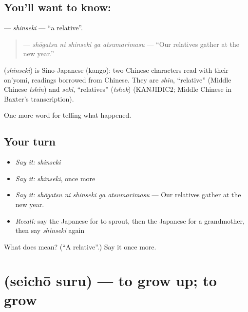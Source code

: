 \subsection*{You'll want to know: }
\textbf{} — \emph{shinseki} — \textquotedblleft{}a relative\textquotedblright{}.

\begin{quote}
\textbf{  } — \emph{shōgatsu ni shinseki ga atsumarimasu} — \textquotedblleft{}Our relatives gather at the new year.\textquotedblright{}
\end{quote}

\begin{cousinweb}
\textbf{} (\emph{shinseki}) is Sino-Japanese (kango): two Chinese characters read with their on'yomi, readings borrowed from Chinese. They are \emph{shin}, \textquotedblleft{}relative\textquotedblright{} (Middle Chinese \emph{tshin}) and \emph{seki}, \textquotedblleft{}relatives\textquotedblright{} (\emph{tshek}) (KANJIDIC2; Middle Chinese in Baxter's transcription).
\end{cousinweb}

\begin{grammarlens}[title={What you've built}]
One more word for telling what happened.
\end{grammarlens}

\subsection*{Your turn}
\begin{itemize}
\raggedright
  \item \emph{Say it:} \emph{shinseki}
  \item \emph{Say it:} \emph{shinseki}, once more
  \item \emph{Say it:} \emph{shōgatsu ni shinseki ga atsumarimasu} — Our relatives gather at the new year.
  \item \emph{Recall:} say the Japanese for to sprout, then the Japanese for a grandmother, then say \emph{shinseki} again
\end{itemize}

\begin{tcolorbox}[breakable,colback=teal!4,colframe=teal!35!black,title={Before you move on}]
What does  mean? (\textquotedblleft{}A relative\textquotedblright{}.) Say it once more.
\end{tcolorbox}
\section[\texorpdfstring{\ja{せいちょうする} (seichō suru)}{せいちょうする (seichō suru)}]{ (seichō suru) — to grow up; to grow}

